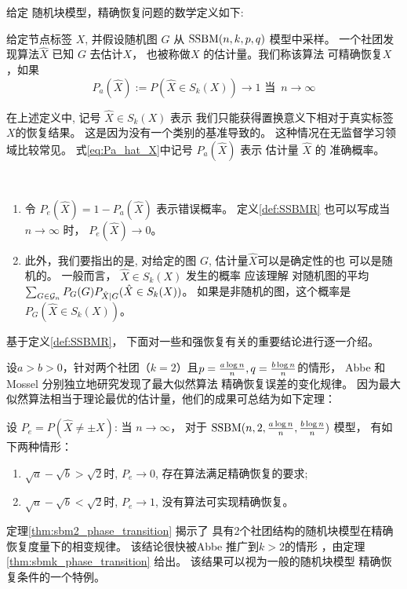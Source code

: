 给定 随机块模型，精确恢复问题的数学定义如下:
\begin{definition} \label{def:SSBMR}
给定节点标签 $X$, 并假设随机图 $G$ 从 $\operatorname{SSBM}(n,k,p,q)   $ 模型中采样。
一个社团发现算法$\hat{X}$ 已知 $G$ 去估计$X$，
也被称做$X$ 的估计量。我们称该算法
可精确恢复$X$，如果
\begin{equation}\label{eq:Pa_hat_X}
P_a(\hat{X}):=P(\hat{X} \in S_k(X)) \to 1 \textrm{ 当 }\, n \to \infty
\end{equation}
\end{definition}

在上述定义中, 记号 $\hat{X} \in S_k(X)$ 表示
我们只能获得置换意义下相对于真实标签$X$的恢复结果。
这是因为没有一个类别的基准导致的。
这种情况在无监督学习领域比较常见。
式\eqref{eq:Pa_hat_X}中记号 $P_a(\hat{X})$
表示 估计量 $\hat{X}$ 的
准确概率。
\begin{remark}\label{rem:metric_exact_recovery}\,
  \begin{enumerate}
    \item 令 $P_e(\hat{X}) = 1 - P_a(\hat{X})$
    表示错误概率。
    定义\ref{def:SSBMR} 也可以写成当$n\to \infty$
    时，
    $P_e(\hat{X}) \to 0$。
  \item  此外，我们要指出的是, 对给定的图 $G$, 估计量$\hat{X}$可以是确定性的也
  可以是随机的。
  一般而言， $\hat{X} \in S_k(X)$ 发生的概率 应该理解
  对随机图的平均 $\sum_{G \in \mathcal{G}_n} P_G(G) P_{\hat{X}|G}(\hat{X} \in S_k(X))$。 
  如果是非随机的图，这个概率是 $P_G(\hat{X} \in S_k(X))$。  
  \end{enumerate}
\end{remark}

基于定义\ref{def:SSBMR}，
下面对一些和强恢复有关的重要结论进行逐一介绍。

设$a>b>0$，针对两个社团（$k=2$）且$p=\frac{a \log n}{n},q=\frac{b \log n}{n}$的情形，
Abbe \cite{abbe2015exact} 和 Mossel
\cite{mossel2016} 分别独立地研究发现了最大似然算法
精确恢复误差的变化规律。
因为最大似然算法相当于理论最优的估计量，他们的成果可总结为如下定理：
\begin{theorem}\label{thm:sbm2_phase_transition}
设 $P_e=P(\hat{X} \neq \pm X)$: 当 $n \to \infty$，
对于 $\operatorname{SSBM}(n,2,\frac{a \log n}{n}, \frac{b \log n}{n})$ 模型，
有如下两种情形：
	\begin{enumerate}
		\item $\sqrt{a} - \sqrt{b} > \sqrt{2}$时,
    $P_e \to 0$, 存在算法满足精确恢复的要求;
		\item $\sqrt{a} - \sqrt{b} < \sqrt{2}$时,
    $P_e \to 1$, 没有算法可实现精确恢复。
	\end{enumerate}
\end{theorem}
定理\ref{thm:sbm2_phase_transition} 揭示了
具有2个社团结构的随机块模型在精确恢复度量下的相变规律。
该结论很快被Abbe 推广到$k>2$的情形
\cite{abbe2015community}，由定理
\ref{thm:sbmk_phase_transition} 给出。
该结果可以视为一般的随机块模型
精确恢复条件的一个特例。

